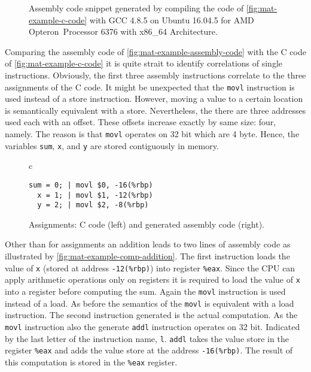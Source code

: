 \documentclass[onecolumn, openany, master, english, seal, signatures]{dbrgrptt}
\begin{document}
\begin{figure}[h!]
  \centering
  \begin{tabular}{c}
  
  \end{tabular}
  \caption{Assembly code snippet generated by compiling the code of \autoref{fig:mat-example-c-code} with GCC 4.8.5 on Ubuntu 16.04.5 for AMD Opteron\texttrademark~Processor 6376 with x86\_64 Architecture.}
  \label{fig:mat-example-assembly-code}
\end{figure}

Comparing the assembly code of \autoref{fig:mat-example-assembly-code} with the C code of \autoref{fig:mat-example-c-code} it is quite strait to identify correlations of single instructions. Obviously, the first three assembly instructions correlate to the three assignments of the C code. It might be unexpected that the \texttt{movl} instruction is used instead of a store instruction. However, moving a value to a certain location is semantically equivalent with a store. Nevertheless, the there are three addresses used each with an offset. These offsets increase exactly by same size: four, namely. The reason is that \texttt{movl} operates on 32 bit which are 4 byte. Hence, the variables \texttt{sum}, \texttt{x}, and \texttt{y} are stored contiguously in memory.

\begin{figure}[h!]
  \centering
  \begin{tabular}{c}
  \begin{lstlisting}
sum = 0; | movl $0, -16(%rbp)
  x = 1; | movl $1, -12(%rbp)
  y = 2; | movl $2, -8(%rbp)
  \end{lstlisting}
  \end{tabular}
  \caption{Assignments: C code (left) and generated assembly code (right).}
  \label{fig:mat-example-comp-assignment}
\end{figure}

Other than for assignments an addition leads to two lines of assembly code as illustrated by \autoref{fig:mat-example-comp-addition}. The first instruction loads the value of \texttt{x} (stored at address \texttt{-12(\%rbp)}) into register \texttt{\%eax}. Since the \ac{CPU} can apply arithmetic operations only on registers it is required to load the value of \texttt{x} into a register before computing the sum. Again the \texttt{movl} instruction is used instead of a load. As before the semantics of the \texttt{movl} is equivalent with a load instruction. The second instruction generated is the actual computation. As the \texttt{movl} instruction also the generate \texttt{addl} instruction operates on 32 bit. Indicated by the last letter of the instruction name, \texttt{l}. \texttt{addl} takes the value store in the register \texttt{\%eax} and adds the value store at the address \texttt{-16(\%rbp)}. The result of this computation is stored in the \texttt{\%eax} register.
\end{document}
